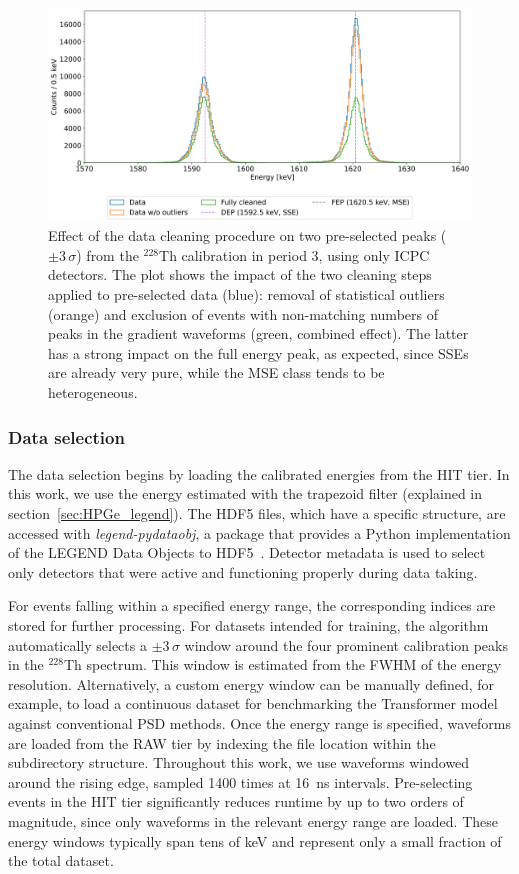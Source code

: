 \begin{figure}[t]
    \centering
    \includegraphics[width=\linewidth]{figures/05_PSD/Data_cleaning_fullspectrum.png}
    \caption{Effect of the data cleaning procedure on two pre-selected peaks ($\pm 3\, \sigma$) from the $^{228}$Th calibration in period 3, using only ICPC detectors. The plot shows the impact of the two cleaning steps applied to pre-selected data (blue): removal of statistical outliers (orange) and exclusion of events with non-matching numbers of peaks in the gradient waveforms (green, combined effect). The latter has a strong impact on the full energy peak, as expected, since SSEs are already very pure, while the MSE class tends to be heterogeneous.} 
\label{fig:datacleaning_fullspectrum}
\end{figure}


\subsubsection{Data selection}

The data selection begins by loading the calibrated energies from the HIT tier. In this work, we use the energy estimated with the trapezoid filter (explained in section~\ref{sec:HPGe_legend}). The HDF5 files, which have a specific structure, are accessed with \textit{legend-pydataobj}, a package that provides a Python implementation of the LEGEND Data Objects to HDF5~\cite{detwiler_legend-pydataobj_2025}. Detector metadata is used to select only detectors that were active and functioning properly during data taking. 

For events falling within a specified energy range, the corresponding indices are stored for further processing. For datasets intended for training, the algorithm automatically selects a $ \pm 3 \,\sigma$ window around the four prominent calibration peaks in the $^{228}$Th spectrum. 
This window is estimated from the FWHM of the energy resolution. Alternatively, a custom energy window can be manually defined, for example, to load a continuous dataset for benchmarking the Transformer model against conventional PSD methods. 
Once the energy range is specified, waveforms are loaded from the RAW tier by indexing the file location within the subdirectory structure. Throughout this work, we use waveforms windowed around the rising edge, sampled 1400 times at 16~ns intervals. 
Pre-selecting events in the HIT tier significantly reduces runtime by up to two orders of magnitude, since only waveforms in the relevant energy range are loaded. These energy windows typically span tens of keV and represent only a small fraction of the total dataset. 

